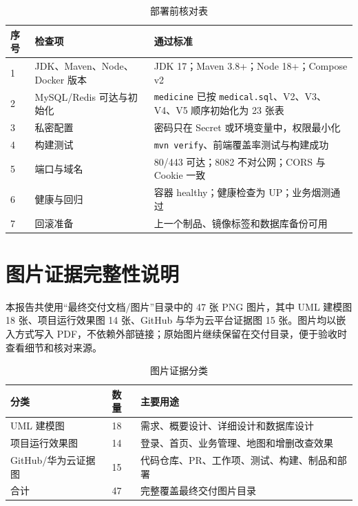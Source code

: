 \documentclass[UTF8,a4paper,12pt,openany,fontset=windows]{ctexrep}
\begin{document}
\begin{table}[H]
  \centering
  \caption{部署前核对表}
  \begin{tabularx}{\textwidth}{p{1.4cm}p{4.5cm}L}
    \toprule
    序号 & 检查项 & 通过标准 \\
     & JDK、Maven、Node、Docker 版本 & JDK 17；Maven 3.8+；Node 18+；Compose v2 \\
    2 & MySQL/Redis 可达与初始化 & \texttt{medicine} 已按 \texttt{medical.sql}、V2、V3、V4、V5 顺序初始化为 23 张表 \\
    3 & 私密配置 & 密码只在 Secret 或环境变量中，权限最小化 \\
    4 & 构建测试 & \texttt{mvn verify}、前端覆盖率测试与构建成功 \\
    5 & 端口与域名 & 80/443 可达；8082 不对公网；CORS 与 Cookie 一致 \\
    6 & 健康与回归 & 容器 healthy；健康检查为 UP；业务烟测通过 \\
    7 & 回滚准备 & 上一个制品、镜像标签和数据库备份可用 \\
    \bottomrule
  \end{tabularx}
\end{table}

\chapter{图片证据完整性说明}

本报告共使用“最终交付文档/图片”目录中的 47 张 PNG 图片，其中 UML 建模图 18 张、项目运行效果图 14 张、GitHub 与华为云平台证据图 15 张。图片均以嵌入方式写入 PDF，不依赖外部链接；原始图片继续保留在交付目录，便于验收时查看细节和核对来源。

\begin{table}[H]
  \centering
  \caption{图片证据分类}
  \begin{tabularx}{\textwidth}{p{4.0cm}p{2.5cm}L}
    \toprule
    分类 & 数量 & 主要用途 \\
    \midrule
    UML 建模图 & 18 & 需求、概要设计、详细设计和数据库设计 \\
    项目运行效果图 & 14 & 登录、首页、业务管理、地图和增删改查效果 \\
    GitHub/华为云证据图 & 15 & 代码仓库、PR、工作项、测试、构建、制品和部署 \\
    合计 & 47 & 完整覆盖最终交付图片目录 \\
    \bottomrule
  \end{tabularx}
\end{table}
\end{document}
